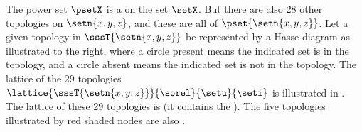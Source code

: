 \begin{minipage}{\tw-45mm}
\begin{example}
\label{ex:set_lat_top_xyz}
\footnotemark
The power set $\psetX$ is a  on the set $\setX$.
But there are also 28 other topologies on $\setn{x,y,z}$, and these are all  of $\pset{\setn{x,y,z}}$.
Let a given topology in $\sssT{\setn{x,y,z}}$ be represented by a Hasse diagram 
as illustrated to the right, where a circle present means the indicated set is in the topology,
and a circle absent means the indicated set is not in the topology.
The lattice of the 29 topologies $\lattice{\sssT{\setn{x,y,z}}}{\sorel}{\setu}{\seti}$
is illustrated in . %
The lattice of these 29 topologies is  (it contains the ).
The five topologies illustrated by red shaded nodes
are also .
\end{example}%
\end{minipage}%
\hfill%
%
\begin{minipage}{42mm}%

\end{minipage}%




